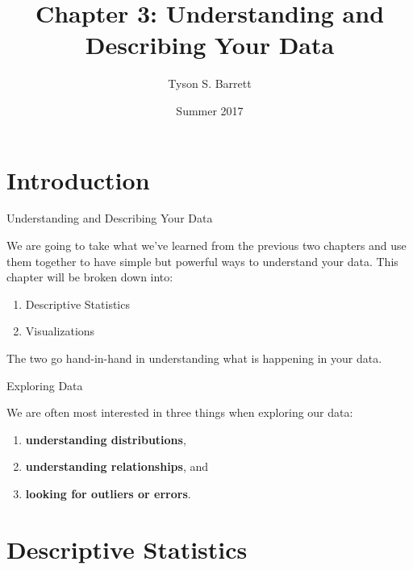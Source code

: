 \documentclass[10pt,ignorenonframetext,]{beamer}
\title{Chapter 3: Understanding and Describing Your Data}
\author{Tyson S. Barrett}
\institute{Utah State University}
\date{Summer 2017}
\providecommand{\tightlist}{%
\setlength{\itemsep}{0pt}\setlength{\parskip}{0pt}}
\begin{document}
\frame{\titlepage}

\begin{frame}
\tableofcontents[hideallsubsections]
\end{frame}

\section{Introduction}\label{introduction}

\begin{frame}{Understanding and Describing Your Data}

We are going to take what we've learned from the previous two chapters
and use them together to have simple but powerful ways to understand
your data. This chapter will be broken down into:

\begin{enumerate}
\def\labelenumi{\arabic{enumi}.}
\tightlist
\item
  Descriptive Statistics
\item
  Visualizations
\end{enumerate}

The two go hand-in-hand in understanding what is happening in your data.

\end{frame}

\begin{frame}{Exploring Data}

We are often most interested in three things when exploring our data:

\begin{enumerate}
\def\labelenumi{\arabic{enumi}.}
\tightlist
\item
  \textbf{understanding distributions},
\item
  \textbf{understanding relationships}, and
\item
  \textbf{looking for outliers or errors}.
\end{enumerate}

\end{frame}

\section{Descriptive Statistics}\label{descriptive-statistics}
\end{document}
